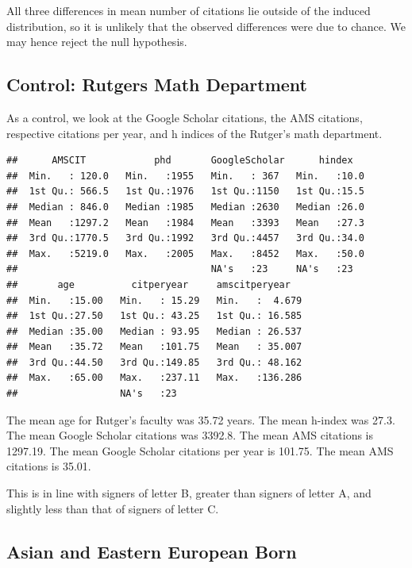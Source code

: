 \documentclass[]{article}
\begin{document}
All three differences in mean number of citations lie outside of the
induced distribution, so it is unlikely that the observed differences
were due to chance. We may hence reject the null hypothesis.

\hypertarget{control-rutgers-math-department}{%
\subsection{Control: Rutgers Math
Department}\label{control-rutgers-math-department}}

As a control, we look at the Google Scholar citations, the AMS
citations, respective citations per year, and h indices of the Rutger's
math department.

\begin{verbatim}
##      AMSCIT            phd       GoogleScholar      hindex    
##  Min.   : 120.0   Min.   :1955   Min.   : 367   Min.   :10.0  
##  1st Qu.: 566.5   1st Qu.:1976   1st Qu.:1150   1st Qu.:15.5  
##  Median : 846.0   Median :1985   Median :2630   Median :26.0  
##  Mean   :1297.2   Mean   :1984   Mean   :3393   Mean   :27.3  
##  3rd Qu.:1770.5   3rd Qu.:1992   3rd Qu.:4457   3rd Qu.:34.0  
##  Max.   :5219.0   Max.   :2005   Max.   :8452   Max.   :50.0  
##                                  NA's   :23     NA's   :23    
##       age          citperyear     amscitperyear    
##  Min.   :15.00   Min.   : 15.29   Min.   :  4.679  
##  1st Qu.:27.50   1st Qu.: 43.25   1st Qu.: 16.585  
##  Median :35.00   Median : 93.95   Median : 26.537  
##  Mean   :35.72   Mean   :101.75   Mean   : 35.007  
##  3rd Qu.:44.50   3rd Qu.:149.85   3rd Qu.: 48.162  
##  Max.   :65.00   Max.   :237.11   Max.   :136.286  
##                  NA's   :23
\end{verbatim}

The mean age for Rutger's faculty was 35.72 years. The mean h-index was
27.3. The mean Google Scholar citations was 3392.8. The mean AMS
citations is 1297.19. The mean Google Scholar citations per year is
101.75. The mean AMS citations is 35.01.

This is in line with signers of letter B, greater than signers of letter
A, and slightly less than that of signers of letter C.

\hypertarget{asian-and-eastern-european-born}{%
\subsection{Asian and Eastern European
Born}\label{asian-and-eastern-european-born}}
\end{document}
